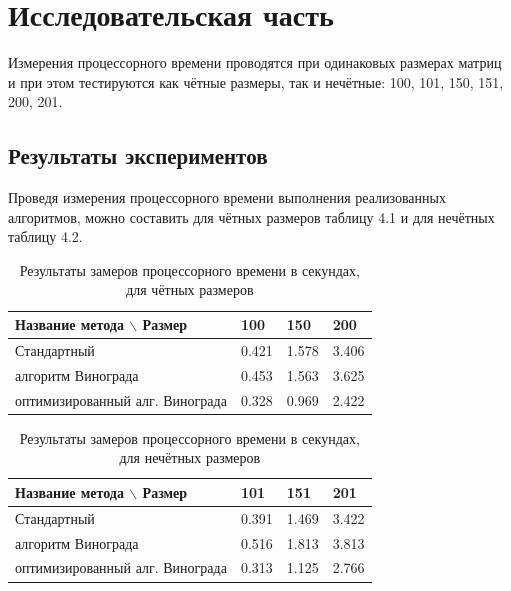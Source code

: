 \documentclass[12pt,a4paper]{report}
\begin{document}
\newpage
\chapter{Исследовательская часть}

Измерения процессорного времени проводятся при одинаковых размерах матриц и при этом тестируются как чётные 
размеры, так и нечётные: 100, 101, 150, 151, 200, 201. 

\section{Результаты экспериментов}

Проведя измерения процессорного времени выполнения реализованных алгоритмов, можно составить для чётных размеров 
таблицу 4.1 и для нечётных таблицу 4.2.

\begin{table}[h]
\caption{Результаты замеров процессорного времени в секундах, для чётных размеров}
\label{tabular:timesandtenses}
\begin{center}
\begin{tabular}{ | l | l | l | l | }
\hline
    Название метода $\backslash$ Размер & 100   & 150   & 200   \\ \hline
    Стандартный                         & 0.421 & 1.578 & 3.406 \\ \hline
    алгоритм Винограда                  & 0.453 & 1.563 & 3.625 \\ \hline
    оптимизированный алг. Винограда     & 0.328 & 0.969 & 2.422 \\ \hline
\end{tabular}
\end{center}
\end{table}

\begin{table}[h]
\caption{Результаты замеров процессорного времени в секундах, для нечётных размеров}
\label{tabular:timesandtenses}
\begin{center}
\begin{tabular}{ | l | l | l | l | }
\hline
        Название метода $\backslash$ Размер & 101   & 151   & 201   \\ \hline
        Стандартный                         & 0.391 & 1.469 & 3.422 \\ \hline
        алгоритм Винограда                  & 0.516 & 1.813 & 3.813 \\ \hline
        оптимизированный алг. Винограда     & 0.313 & 1.125 & 2.766 \\ \hline
\end{tabular}
\end{center}
\end{table}
\end{document}

